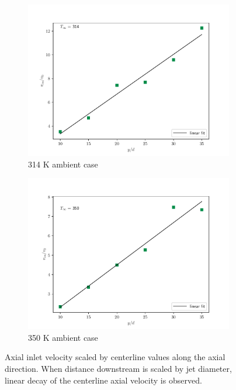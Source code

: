 \begin{figure}[H]
\begin{center}
\begin{subfigure}{0.45\textwidth}
	\includegraphics[scale=.45]{figures/Plots/radial/slices_5/314_ambient/uin_u0_vs_x_d.pdf}
	\caption{314 K ambient case} \label{noniso_uin_u0_x_c_1}
\end{subfigure}
\begin{subfigure}{0.45\textwidth}
	\includegraphics[scale=.45]{figures/Plots/radial/slices_5/350_ambient/uin_u0_vs_x_d.pdf}
	\caption{350 K ambient case} \label{noniso_uin_u0_x_d_2}
\end{subfigure}
\caption{Axial inlet velocity scaled by centerline values along the axial direction. When distance downstream is scaled by jet diameter, linear decay of the centerline axial velocity is observed.}
\label{noniso_uin_u0_x_d_features}
\end{center}
\end{figure}

